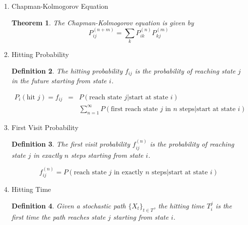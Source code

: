 \documentclass{article}
\newtheorem{definition}{Definition}[section]
\newtheorem{theorem}{Theorem}[section]
\begin{document}
\begin{enumerate}
\begin{definition}
          \begin{equation}
            P^{(n)}_{ij} = P(X_{t_n} = j | X_{t_0} = i)
          \end{equation}
          where $t_n = t_0 + n$.
        \end{definition}
  \item Chapman-Kolmogorov Equation
        \begin{theorem}
          The Chapman-Kolmogorov equation is given by
          \begin{equation}
            P^{(n+m)}_{ij} = \sum_{k} P^{(n)}_{ik} P^{(m)}_{kj}
          \end{equation}
        \end{theorem}
  \item Hitting Probability
        \begin{definition}
          The hitting probability $f_{ij}$ is the probability of reaching state $j$
          in the future
          starting from state $i$.

          \begin{eqnarray}
            P_{i}(\text{hit } j) = f_{ij} &=& P(\text{reach state } j | \text{start at state } i) \\
            && \sum_{n=1}^{\infty} P(\text{first reach state } j \text{ in } n \text{ steps} | \text{start at state } i)
          \end{eqnarray}
        \end{definition}
  \item First Visit Probability
        \begin{definition}
          The first visit probability $f_{ij}^{(n)}$ is the probability of reaching state $j$
          in exactly $n$ steps
          starting from state $i$.

          \begin{equation}
            f_{ij}^{(n)} = P(\text{reach state } j \text{ in exactly } n \text{ steps} | \text{start at state } i)
          \end{equation}
        \end{definition}
  \item Hitting Time
        \begin{definition}
          Given a stochastic path $\{X_t\}_{t \in T}$, the hitting time $T_{i}^{j}$ is the first time
          the path reaches state $j$ starting from state $i$.


\end{definition}
\end{enumerate}
\end{document}
